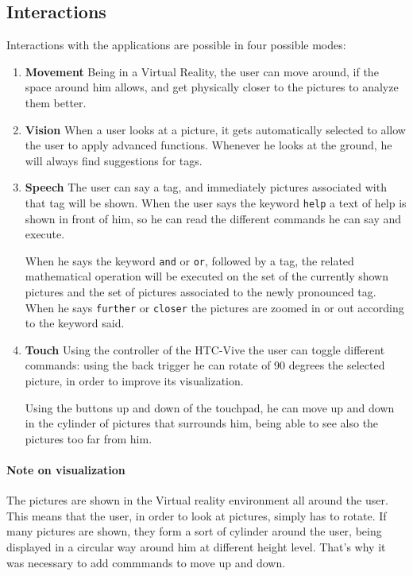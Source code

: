 \documentclass[11pt,a4paper]{article}
\begin{document}
\subsection{Interactions}
Interactions with the applications are possible in four possible modes:
\begin{enumerate}
\item \textbf{Movement} Being in a Virtual Reality, the user can move around, if the space around him allows, and get physically closer to the pictures to analyze them better.

\item \textbf{Vision}
When a user looks at a picture, it gets automatically selected to allow the user to apply advanced functions.
Whenever he looks at the ground, he will always find suggestions for tags.

\item \textbf{Speech} The user can say a tag, and immediately pictures associated with that tag will be shown.
When the user says the keyword \texttt{help} a text of help is shown in front of him, so he can read the different commands he can say and execute.

When he says the keyword \texttt{and} or \texttt{or}, followed by a tag, the related mathematical operation will be executed on the set of the currently shown pictures and the set of pictures associated to the newly pronounced tag.
When he says \texttt{further} or \texttt{closer} the pictures are zoomed in or out according to the keyword said.

\item \textbf{Touch} Using the controller of the HTC-Vive the user can toggle different commands:
using the back trigger he can rotate of 90 degrees the selected picture, in order to improve its visualization.

Using the buttons up and down of the touchpad, he can move up and down in the cylinder of pictures that surrounds him, being able to see also the pictures too far from him.

\end{enumerate}

\paragraph{Note on visualization} The pictures are shown in the Virtual reality environment all around the user. 
This means that the user, in order to look at pictures, simply has to rotate.
If many pictures are shown, they form a sort of cylinder around the user, being displayed in a circular way around him at different height level. That's why it was necessary to add commmands to move up and down.
\end{document}
